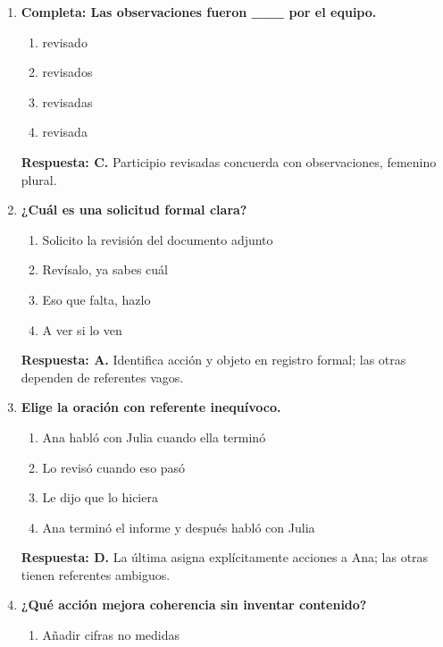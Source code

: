 \begin{enumerate}
\begin{enumerate}[label=\Alph*)]
\item La investigación, identifica patrones
\item La investigación identifica patrones
\item La, investigación identifica patrones
\item La investigación identifica, patrones
\end{enumerate}
\textbf{Respuesta: B.} No se separa sujeto de predicado sin inciso; las demás comas rompen la estructura.
\item\textbf{Completa: Las observaciones fueron \_\_\_ por el equipo.}
\begin{enumerate}[label=\Alph*)]
\item revisado
\item revisados
\item revisadas
\item revisada
\end{enumerate}
\textbf{Respuesta: C.} Participio revisadas concuerda con observaciones, femenino plural.
\item\textbf{¿Cuál es una solicitud formal clara?}
\begin{enumerate}[label=\Alph*)]
\item Solicito la revisión del documento adjunto
\item Revísalo, ya sabes cuál
\item Eso que falta, hazlo
\item A ver si lo ven
\end{enumerate}
\textbf{Respuesta: A.} Identifica acción y objeto en registro formal; las otras dependen de referentes vagos.
\item\textbf{Elige la oración con referente inequívoco.}
\begin{enumerate}[label=\Alph*)]
\item Ana habló con Julia cuando ella terminó
\item Lo revisó cuando eso pasó
\item Le dijo que lo hiciera
\item Ana terminó el informe y después habló con Julia
\end{enumerate}
\textbf{Respuesta: D.} La última asigna explícitamente acciones a Ana; las otras tienen referentes ambiguos.
\item\textbf{¿Qué acción mejora coherencia sin inventar contenido?}
\begin{enumerate}[label=\Alph*)]
\item Añadir cifras no medidas

\end{enumerate}
\end{enumerate}
